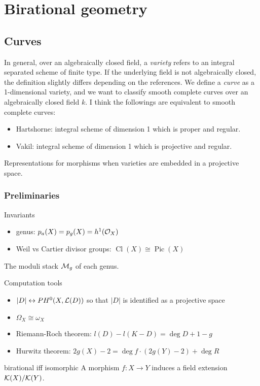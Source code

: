 \documentclass{../../large}
\newcommand{\Cl}{\operatorname{Cl}}
\newcommand{\Pic}{\operatorname{Pic}}
\begin{document}
\part{Birational geometry}

\chapter{Curves}


In general, over an algebraically closed field, a \emph{variety} refers to an integral separated scheme of finite type.
If the underlying field is not algebraically closed, the definition slightly differs depending on the references.
We define a \emph{curve} as a 1-dimensional variety, and we want to classify smooth complete curves over an algebraically closed field $k$.
I think the followings are equivalent to smooth complete curves:
\begin{itemize}
\item Hartshorne: integral scheme of dimension 1 which is proper and regular.
\item Vakil: integral scheme of dimension 1 which is projective and regular.
\end{itemize}


Representations for morphisms when varieties are embedded in a projective space.

\section{Preliminaries}
Invariants
\begin{itemize}
\item genus: $p_a(X)=p_g(X)=h^1(\mathcal{O}_X)$
\item Weil vs Cartier divisor groups: $\Cl(X)\cong\Pic(X)$
\end{itemize}
The moduli stack $\mathcal{M}_g$ of each genus.

Computation tools
\begin{itemize}
\item $|D|\leftrightarrow PH^0(X,\mathcal{L}(D))$ so that $|D|$ is identified as a projective space
\item $\Omega_X\cong\omega_X$
\item Riemann-Roch theorem: $l(D)-l(K-D)=\deg D+1-g$
\item Hurwitz theorem: $2g(X)-2=\deg f\cdot(2g(Y)-2)+\deg R$
\end{itemize}


birational iff isomorphic
A morphism $f:X\to Y$ induces a field extension $\mathcal{K}(X)/\mathcal{K}(Y)$.
\end{document}
